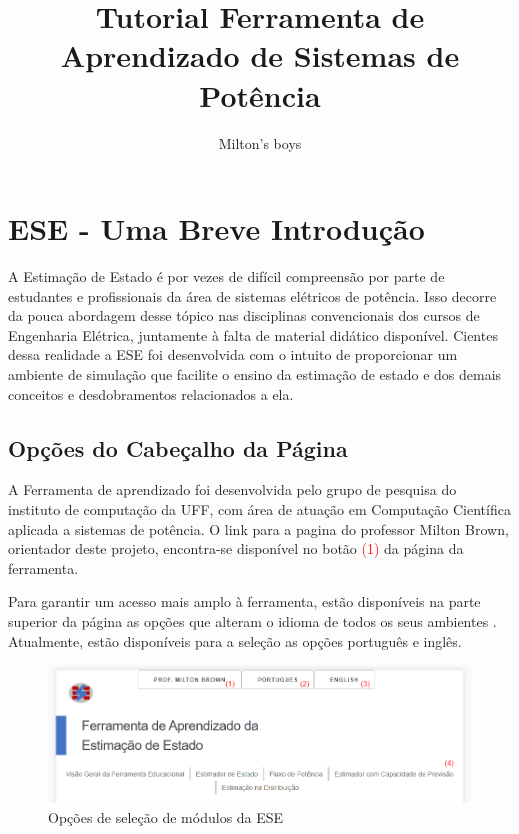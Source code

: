 \documentclass{article}
\title{\textbf{Tutorial Ferramenta de Aprendizado de Sistemas de Potência}}
\author{Milton's boys}
\begin{document}
\maketitle

\section{ESE - Uma Breve Introdução}

A Estimação de Estado é por vezes de difícil compreensão  por parte de estudantes e profissionais da área de sistemas elétricos de potência. Isso decorre da pouca abordagem desse tópico nas disciplinas convencionais dos cursos de Engenharia Elétrica, juntamente à falta de material didático disponível. Cientes dessa realidade a ESE foi desenvolvida com o intuito de proporcionar um ambiente de simulação que facilite o ensino da estimação de estado e dos demais conceitos e desdobramentos relacionados a ela. 

\subsection{Opções do Cabeçalho da Página}
A Ferramenta de aprendizado foi desenvolvida pelo grupo de pesquisa do instituto de computação da UFF, com área de atuação em Computação Científica aplicada a sistemas de potência.
O link para a pagina do professor Milton Brown, orientador deste projeto,  encontra-se disponível no botão \textcolor{red}{(1)} da página da ferramenta.

Para garantir um acesso mais amplo à ferramenta, estão disponíveis na parte superior da página as opções que alteram o idioma de todos os seus ambientes . Atualmente, estão disponíveis para a seleção as opções português e inglês.

\begin{figure}[H]
\centering
\includegraphics[scale=.4]{Imagens/Topo_pagina.png}
\caption{Opções de seleção de módulos da ESE}
\label{fig:opções_cabeçalio}
\end{figure}
\end{document}
